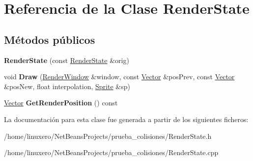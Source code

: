 \hypertarget{classRenderState}{\section{Referencia de la Clase Render\-State}
\label{classRenderState}
}
\subsection*{Métodos públicos}
\begin{DoxyCompactItemize}
\item 
\hypertarget{classRenderState_ad749377bf54064af4921296f7c5c6b5f}{{\bfseries Render\-State} (const \hyperlink{classRenderState}{Render\-State} \&orig)}\label{classRenderState_ad749377bf54064af4921296f7c5c6b5f}

\item 
\hypertarget{classRenderState_a38a5e2a4458a45ce1b77b61b59b02320}{void {\bfseries Draw} (\hyperlink{classRenderWindow}{Render\-Window} \&window, const \hyperlink{classVector}{Vector} \&pos\-Prev, const \hyperlink{classVector}{Vector} \&pos\-New, float interpolation, \hyperlink{classSprite}{Sprite} \&sp)}\label{classRenderState_a38a5e2a4458a45ce1b77b61b59b02320}

\item 
\hypertarget{classRenderState_aaf28ada21e82dae301d41adae6a35efb}{\hyperlink{classVector}{Vector} {\bfseries Get\-Render\-Position} () const }\label{classRenderState_aaf28ada21e82dae301d41adae6a35efb}

\end{DoxyCompactItemize}


La documentación para esta clase fue generada a partir de los siguientes ficheros\-:\begin{DoxyCompactItemize}
\item 
/home/linuxero/\-Net\-Beans\-Projects/prueba\-\_\-colisiones/Render\-State.\-h\item 
/home/linuxero/\-Net\-Beans\-Projects/prueba\-\_\-colisiones/Render\-State.\-cpp\end{DoxyCompactItemize}
